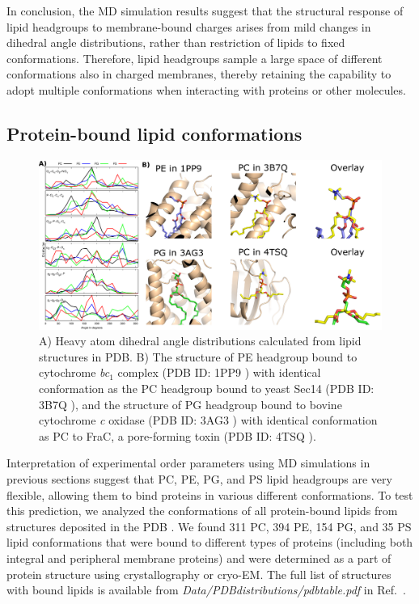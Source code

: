 \documentclass[journal=jpcbfk,manuscript=article]{achemso}
\begin{document}
In conclusion, the MD simulation results suggest that the structural response of lipid headgroups to 
membrane-bound charges arises
from mild changes in dihedral angle distributions, rather than restriction of lipids to
fixed conformations. Therefore, lipid headgroups sample a large space of different conformations
also in charged membranes, thereby retaining the capability to adopt multiple conformations when
interacting with proteins or other molecules.



\subsection{Protein-bound lipid conformations}

\begin{figure}[tb]
  \centering
  \includegraphics[width=\textwidth]{./Figs/figure4.eps}
  \caption{\label{dihedralsFROMpdb}
    A) Heavy atom dihedral angle distributions calculated from lipid structures in PDB.
    B) The structure of PE headgroup bound to cytochrome {\it bc}$_1$ complex (PDB ID: 1PP9 \cite{huang05})
    with identical conformation as the PC headgroup bound to yeast Sec14 (PDB ID: 3B7Q \cite{schaaf08}),
    and the structure of PG headgroup bound to bovine cytochrome {\it c} oxidase (PDB ID: 3AG3 \cite{muramoto10})
    with identical conformation as PC to FraC, a pore-forming toxin (PDB ID: 4TSQ \cite{tanaka15}).
  }
\end{figure}


Interpretation of experimental order parameters using MD simulations
in previous sections suggest that PC, PE, PG, and PS lipid headgroups are very flexible,
allowing them to bind proteins in various different conformations.
To test this prediction, we analyzed the conformations of all protein-bound lipids 
from structures deposited in the PDB \cite{berman00}.
We found 311 PC, 394 PE, 154 PG, and 35 PS lipid conformations that were bound to different types of proteins 
(including both integral and peripheral membrane proteins) and were determined as a part of protein structure using crystallography or cryo-EM. The full list of structures with bound lipids is available from {\it Data/PDBdistributions/pdbtable.pdf} in Ref.~\cite{NMRlipidsIVbgit}.
\end{document}
